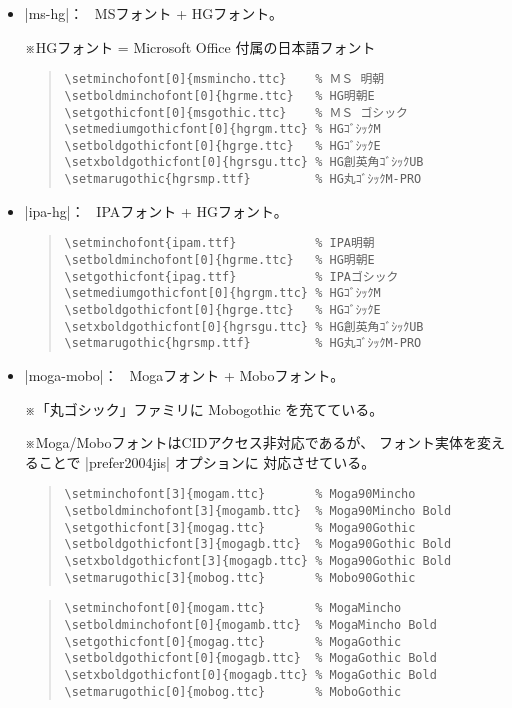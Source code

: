 \documentclass[a4paper,uplatex]{jsarticle}
\newcommand{\Note}{\par\noindent ※}
\newcommand{\Means}{：\ }
\begin{document}
\begin{itemize}
\item |ms-hg|\Means
  MSフォント + HGフォント。
  \Note HGフォント = Microsoft Office 付属の日本語フォント
\begin{quote}\small\begin{verbatim}
\setminchofont[0]{msmincho.ttc}    % ＭＳ 明朝
\setboldminchofont[0]{hgrme.ttc}   % HG明朝E
\setgothicfont[0]{msgothic.ttc}    % ＭＳ ゴシック
\setmediumgothicfont[0]{hgrgm.ttc} % HGｺﾞｼｯｸM
\setboldgothicfont[0]{hgrge.ttc}   % HGｺﾞｼｯｸE
\setxboldgothicfont[0]{hgrsgu.ttc} % HG創英角ｺﾞｼｯｸUB
\setmarugothic{hgrsmp.ttf}         % HG丸ｺﾞｼｯｸM-PRO 
\end{verbatim}\end{quote}

\item |ipa-hg|\Means
   IPAフォント + HGフォント。
\begin{quote}\small\begin{verbatim}
\setminchofont{ipam.ttf}           % IPA明朝
\setboldminchofont[0]{hgrme.ttc}   % HG明朝E
\setgothicfont{ipag.ttf}           % IPAゴシック
\setmediumgothicfont[0]{hgrgm.ttc} % HGｺﾞｼｯｸM
\setboldgothicfont[0]{hgrge.ttc}   % HGｺﾞｼｯｸE
\setxboldgothicfont[0]{hgrsgu.ttc} % HG創英角ｺﾞｼｯｸUB
\setmarugothic{hgrsmp.ttf}         % HG丸ｺﾞｼｯｸM-PRO 
\end{verbatim}\end{quote}

\item |moga-mobo|\Means
   Mogaフォント + Moboフォント。
   \Note 「丸ゴシック」ファミリに Mobogothic を充てている。
   \Note Moga/MoboフォントはCIDアクセス非対応であるが、
   フォント実体を変えることで |prefer2004jis| オプションに
   対応させている。
   \par\medskip
\begin{quote}\small\begin{verbatim}
\setminchofont[3]{mogam.ttc}       % Moga90Mincho
\setboldminchofont[3]{mogamb.ttc}  % Moga90Mincho Bold
\setgothicfont[3]{mogag.ttc}       % Moga90Gothic
\setboldgothicfont[3]{mogagb.ttc}  % Moga90Gothic Bold
\setxboldgothicfont[3]{mogagb.ttc} % Moga90Gothic Bold
\setmarugothic[3]{mobog.ttc}       % Mobo90Gothic
\end{verbatim}\end{quote}
   \par\medskip
\begin{quote}\small\begin{verbatim}
\setminchofont[0]{mogam.ttc}       % MogaMincho
\setboldminchofont[0]{mogamb.ttc}  % MogaMincho Bold
\setgothicfont[0]{mogag.ttc}       % MogaGothic
\setboldgothicfont[0]{mogagb.ttc}  % MogaGothic Bold
\setxboldgothicfont[0]{mogagb.ttc} % MogaGothic Bold
\setmarugothic[0]{mobog.ttc}       % MoboGothic
\end{verbatim}\end{quote}


\end{itemize}
\end{document}
